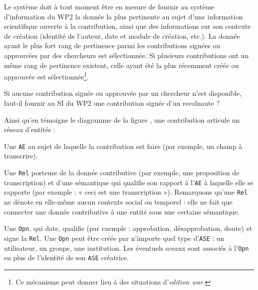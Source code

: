 \exig{}
Le système doit à tout moment être en mesure de fournir au système d'information du WP2 la donnée la plus pertinente au sujet d'une information scientifique ouverte à la contribution, ainsi que des informations sur son contexte de création (identité de l'auteur, date et module de création, etc.).
La donnée ayant le plus fort rang de pertinence parmi les contributions signées ou approuvées par des chercheurs est sélectionnée.
Si plusieurs contributions ont un même rang de pertinence existent, celle ayant été la plus récemment créée ou approuvée est sélectionnée\footnote{Ce mécanisme peut donner lieu à des situations d'{\it edition war}.}.

\idea{}
Si aucune contribution signée ou approuvée par un chercheur n'est disponible, faut-il fournir au SI du WP2 une contribution signée d'un recolnaute ?

\startsection[title={Éléments de modélisation},reference=c:relopn:s:model]

\startsubsection[title={Contribution = Relation + Opinion}]

Ainsi qu'en témoigne le diagramme de la figure , une contribution articule un réseau d'entités :

\startitemize
	\item
	Une {\tt AE} au sujet de laquelle la contribution est faire (par exemple, un champ à transcrire).
	\item
	Une {\tt Rel} porteuse de la donnée contributive (par exemple, une proposition de transcription) et d'une sémantique qui qualifie son rapport à l'{\tt AE} à laquelle elle se rapporte (par exemple : « ceci est une transcription »).
	Remarquons qu'une {\tt Rel} ne dénote en elle-même aucun contexte social ou temporel : elle ne fait que connecter une donnée contributive à une entité sous une certaine sémantique.
	\item
	Une {\tt Opn}, qui date, qualifie (par exemple : approbation, désapprobation, doute) et signe la {\tt Rel}.
	Une {\tt Opn} peut être créée par n'importe quel type d'{\tt ASE} : un utilisateur, un groupe, une institution.
	Les éventuels sceaux sont associés à l'{\tt Opn} en plus de l'identité de son {\tt ASE} créatrice.
\stopitemize

